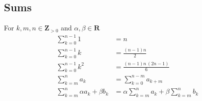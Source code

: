 \documentclass[letterpaper,9pt,fleqn]{extarticle}
\begin{document}
\begin{multicols*}{3}
\begin{minipage}{0.33333333333333\textwidth}
\section*{Sums}
\vspace{-0.35in}
For \(k, m,n\in \mathbf{Z}_{>0}\) and \(\alpha,\beta \in \mathbf{R}\)
\begin{align*}
    \sum_{k=0}^{n-1}1 &= n \\
   \sum_{k=0}^{n-1}{\left. k\right.}&=\frac{\left( n-1\right)  n}{2}\\
   \sum_{k=0}^{n-1}{\left. {{k}^{2}}\right.}&=\frac{\left( n-1\right)  n\, \left( 2 n-1\right) }{6}\\
   \sum_{k=m}^n a_k &= \sum_{k=0}^{n-m} a_{k+m}\\
  \sum_{k=m}^n \alpha a_k + \beta b_k &=  
  \alpha \sum_{k=m}^n a_k + \beta \sum_{k=m}^n b_k
 \end{align*}
\begin{comment}
(c) Inverse trig
\begin{align*}
\int {\left. \operatorname{acos}(x)\mathrm{d} x\right.}&=x \operatorname{acos}(x)-\sqrt{1-{{x}^{2}}},\\
\int {\left. \operatorname{asin}(x)\mathrm{d} x\right.}&=x \operatorname{asin}(x)+\sqrt{1-{{x}^{2}}},\\
\int {\left. \operatorname{atan}(x)\mathrm{d} x\right.}&=x \operatorname{atan}(x)-\nicefrac{\log{\left( {{x}^{2}}+1\right) }}{2}.
\end{align*}
(b)  Hyperbolic
\begin{align}
\int {\left. \cosh{(x)}\mathrm{d} x\right.}&=\operatorname{sinh}(x),\\
\int {\left. \operatorname{sinh}(x)\mathrm{d} x\right.}&=\cosh{(x)},\\
\int {\left. \operatorname{tanh}(x)\mathrm{d} x\right.}&=\ln{\left( \cosh{(x)}\right) },\\
\int {\left. \operatorname{sech}(x)\mathrm{d} x\right.}&=\operatorname{atan}\left( \operatorname{sinh}(x)\right) ,\\
\int {\left. \operatorname{csch}(x)\mathrm{d} x\right.}&=\ln{\left( \operatorname{tanh}\left( \nicefrac{x}{2}\right) \right) },\\
\int {\left. \operatorname{coth}(x)\mathrm{d} x\right.}&=\ln{\left( \operatorname{sinh}(x)\right) }.
\end{align}
(c) Algebraic 
\begin{align}
\int {\left. \nicefrac{1}{\sqrt{1-{{x}^{2}}}}\mathrm{d} x\right.}&=\operatorname{asin}(x),\\

\end{comment}
\end{minipage}
\end{multicols*}
\end{document}
